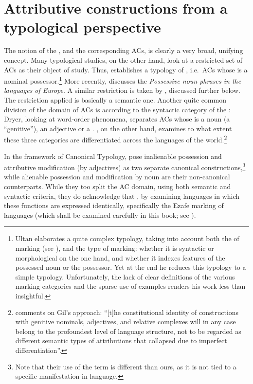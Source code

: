 \section{Attributive constructions from a typological perspective} \label{ss:AC_typ}
\largerpage
The notion of the , and the corresponding ACs,  is clearly a very broad, unifying concept. Many typological studies, on the other hand, look at a restricted set of ACs as their object of study. Thus, \citet{UltanPossession} establishes a typology of , i.e.\ ACs whose \secn is a nominal possessor.\footnote{Ultan elaborates a quite complex typology, taking into account both the  of marking (see ), and the type of marking: whether it is syntactic or morphological on the one hand, and whether it indexes features of the possessed noun or the possessor. Yet  at the end he reduces this typology to a simple  typology. Unfortunately, the lack of clear definitions of the various marking categories and the sparse use of examples renders his work less than insightful.}  More recently, \citet{Tamm2003Possessive} discusses the \textit{Possessive noun phrases in the languages of Europe}. A similar restriction is taken by \citet{NicholsBickelWals}, discussed further below. The restriction applied is basically a semantic one. Another quite common division of the domain of ACs is according to the syntactic category of the \secn: Dryer, looking at word-order phenomena, separates ACs whose \secn is a noun (a \enquote{genitive}), an adjective or a  \citep{DryerWALS86, DryerWALS87, DryerWALS90}. \citet{GilWals60}, on the other hand, examines to what extent these three categories are differentiated across the languages of the world.\footnote{\citet[235]{GoldenbergSemitic} comments on Gil's approach: \enquote{[t]he constitutional identity of constructions with genitive nominals, adjectives, and relative complexes will in any case belong to the profoundest level of language structure, not to be regarded as different semantic types of attributions that collapsed due to imperfect differentiation}. }



\newpage 
In the framework of Canonical Typology, \citet{NikolaevaSpencer} pose inalienable possession and attributive modification (by adjectives) as two separate canonical constructions,\footnote{Note that their use of the term  is different than ours, as it is not tied to a specific manifestation in language.} while alienable possession and modification by noun are their non-canonical counterparts. While they too split the AC domain, using both  semantic and syntactic criteria, they do acknowledge that , by examining languages in which these functions are expressed identically, specifically the {Ezafe} marking of  languages (which shall be examined carefully in this book; see ).

